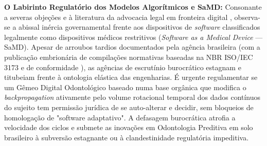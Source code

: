 \textbf{O Labirinto Regulatório dos Modelos Algorítmicos e SaMD:} Consonante a severas objeções e à literatura da advocacia legal em fronteira digital \cite{ethical2026realising}, observa-se a abissal inércia governamental frente aos dispositivos de \textit{software} classificados legalmente como dispositivos médicos restritivos (\textit{Software as a Medical Device} --- SaMD). Apesar de arroubos tardios documentados pela agência brasileira (com a publicação embrionária de compilações normativas baseadas na NBR ISO/IEC 3173 e de conformidade \cite{abinc2026brasil}), as agências de escrutínio burocrático estagnam e titubeiam frente à ontologia elástica das engenharias. É urgente regulamentar se um Gêmeo Digital Odontológico baseado numa base orgânica que modifica o \textit{backpropagation} ativamente pelo volume rotacional temporal dos dados contínuos do sujeito tem permissão jurídica de se auto-alterar e decidir, sem bloqueios de homologação de "software adaptativo". A defasagem burocrática atrofia a velocidade dos ciclos e submete as inovações em Odontologia Preditiva em solo brasileiro à subversão estagnante ou à clandestinidade regulatória impeditiva.
